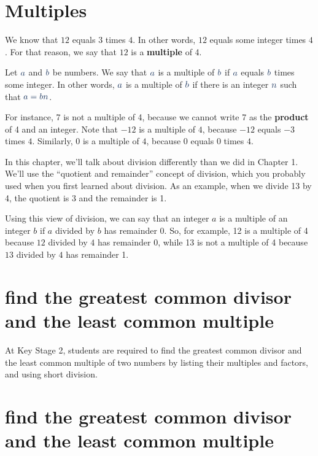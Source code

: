 \section{Multiples}
We know that $12$ equals $3$ times $4$. In other words, $12$ equals some integer times $4$. For that reason, we say that $12$ is a \textbf{multiple}  of 4.
\begin{definition}
Let $\color[rgb]{0.11,0.21,0.37}a$ and $\color[rgb]{0.11,0.21,0.37}b$ be numbers. We say that $\color[rgb]{0.11,0.21,0.37}a$ is a multiple of $\color[rgb]{0.11,0.21,0.37}b$ if $\color[rgb]{0.11,0.21,0.37}a$ equals $\color[rgb]{0.11,0.21,0.37}b$ times some integer. In other words, $\color[rgb]{0.11,0.21,0.37}a$ is a multiple of $\color[rgb]{0.11,0.21,0.37}b$ if there is an integer $\color[rgb]{0.11,0.21,0.37}n$ such that $\color[rgb]{0.11,0.21,0.37}a = bn$.
\end{definition}
For instance, 7 is not a multiple of 4, because we cannot write 7 as the  \textbf{product}  of 4 and an integer. Note that $-12$ is a multiple of $4$, because $-12$ equals $-3$ times $4$. Similarly, $0$ is a multiple of $4$, because $0$ equals $0$ times $4$.

In this chapter, we’ll talk about division differently than we did in Chapter 1. We’ll use the “quotient and remainder” concept of division, which you probably used when you first learned about division. As an example, when we divide 13 by 4, the quotient is 3 and the remainder is 1.

Using this view of division, we can say that an integer $a$ is a multiple of an integer $b$ if $a$ divided by $b$ has remainder 0. So, for example, 12 is a multiple of 4 because $12$ divided by $4$ has remainder 0, while 13 is not a multiple of 4 because $13$ divided by $4$ has remainder 1.
\section{find the greatest common divisor and the least
common multiple}

At Key Stage 2, students are required to find
the greatest common divisor and the least
common multiple of two numbers by listing
their multiples and factors, and using short
division.

\section{find the greatest common divisor and the least
common multiple}

